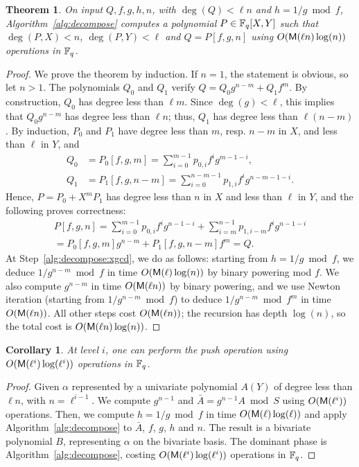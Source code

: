 \documentclass{sig-alternate}
\newtheorem{theorem}[definition]{Theorem}
\newtheorem{corollary}[definition]{Corollary}
\begin{document}
\begin{theorem}
  On input $Q,f,g,h,n$, with $\deg(Q) < \ell n$ and $h = 1/g \bmod f$,
  Algorithm~\ref{alg:decompose} computes a polynomial $P\in \mathbb{F}_q[X,Y]$
  such that $\deg(P,X)<n$, $\deg(P,Y) <\ell$ and $Q=P[f,g,n]$ using
  $O(\mathsf{M}(\ell n)\log(n))$ operations in $\mathbb{F}_q$.
\end{theorem}
\begin{proof}
  We prove the theorem by induction. If $n=1$, the statement is
  obvious, so let $n> 1$. The polynomials $Q_0$ and $Q_1$ verify $Q =
  Q_0g^{n-m} + Q_1f^m.$ By construction, $Q_0$ has degree less than $\ell
  m$. Since $\deg(g) < \ell$, this implies that $Q_0 g^{n-m}$ has
  degree less than $\ell n$; thus, $Q_1$ has degree less than $\ell
  (n-m)$. By induction, $P_0$ and $P_1$ have degree less than $m$,
  resp. $n-m$ in $X$, and less than  $\ell$ in $Y$, and
  \begin{equation*}
    \begin{aligned}
      Q_0 &= P_0[f,g,m] = \sum_{i=0}^{m-1} p_{0,i}f^ig^{m-1-i},\\
      Q_1 &= P_1[f,g,n-m] = \sum_{i=0}^{n-m-1} p_{1,i}f^ig^{n-m-1-i}.
    \end{aligned}
  \end{equation*}
  Hence, $P=P_0+X^mP_1$ has degree less than $n$ in $X$ and less than $\ell$ 
  in $Y$, and the following proves correctness:
  \begin{multline*}
    P[f,g,n] = \sum_{i=0}^{m-1}p_{0,i}f^ig^{n-1-i} + 
    \sum_{i=m}^{n-1}p_{1,i-m}f^ig^{n-1-i} \\
    =P_0[f,g,m]g^{n-m} + P_1[f,g,n-m]f^m = Q.
  \end{multline*}
  At Step~\ref{alg:decompose:xgcd}, we do as follows: starting from
  $h=1/g \bmod f$, we deduce $1/g^{n-m} \bmod f$ in time
  $O(\mathsf{M}(\ell)\log(n))$ by binary powering mod $f$. We also compute
  $g^{n-m}$ in time $O(\mathsf{M}(\ell n))$ by binary powering, and we use
  Newton iteration (starting from $1/g^{n-m} \bmod f$) to deduce
  $1/g^{n-m} \bmod f^m$ in time $O(\mathsf{M}(\ell n))$. All other steps
  cost $O(\mathsf{M}(\ell n))$; the recursion has depth $\log(n)$,
  so the total cost is $O(\mathsf{M}(\ell n)\log(n))$.
\end{proof}

\begin{corollary}
  At level $i$, one can perform the push operation using
  $O(\mathsf{M}(\ell^i)\log(\ell^i))$ operations in $\mathbb{F}_q$.
\end{corollary}
\begin{proof}
  Given $\alpha$ represented by a univariate polynomial $A(Y)$ of
  degree less than $\ell n$, with $n =\ell^{i-1}$. We compute
  $g^{n-1}$ and $\bar{A} = g^{n-1} A \bmod S$ using $O(\mathsf{M}(\ell^i))$
  operations. Then, we compute $h=1/g \bmod f$ in time
  $O(\mathsf{M}(\ell)\log(\ell))$ and apply Algorithm~\ref{alg:decompose}
  to $\bar{A}$, $f$, $g$, $h$ and $n$. The result is a bivariate
  polynomial $B$, representing $\alpha$ on the bivariate basis. The
  dominant phase is Algorithm~\ref{alg:decompose}, costing
  $O(\mathsf{M}(\ell^i)\log(\ell^i))$ operations in $\mathbb{F}_q$.
\end{proof}
\end{document}
